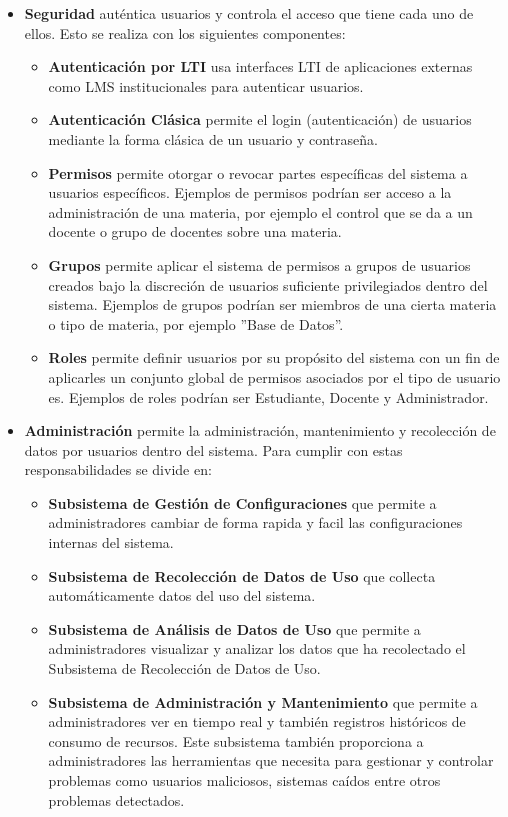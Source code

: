 \begin{itemize}
	\item \textbf{Seguridad} auténtica usuarios y controla el acceso que tiene cada uno de ellos. Esto se realiza con los siguientes componentes:
    \begin{itemize}
    	\item \textbf{Autenticación por LTI} usa interfaces LTI de aplicaciones externas como LMS institucionales para autenticar usuarios.
		\item \textbf{Autenticación Clásica} permite el login (autenticación) de usuarios mediante la forma clásica de un usuario y contraseña.
		\item \textbf{Permisos} permite otorgar o revocar partes específicas del sistema a usuarios específicos. Ejemplos de permisos podrían ser acceso a la administración de una materia, por ejemplo el control que se da a un docente o grupo de docentes sobre una materia.
		\item \textbf{Grupos} permite aplicar el sistema de permisos a grupos de usuarios creados bajo la discreción de usuarios suficiente privilegiados dentro del sistema. Ejemplos de grupos podrían ser miembros de una cierta materia o tipo de materia, por ejemplo ''Base de Datos''.
		\item \textbf{Roles} permite definir usuarios por su propósito del sistema con un fin de aplicarles un conjunto global de permisos asociados por el tipo de usuario es. Ejemplos de roles podrían ser Estudiante, Docente y Administrador.
    \end{itemize}
    \item \textbf{Administración} permite la administración, mantenimiento y recolección de datos por usuarios dentro del sistema. Para cumplir con estas responsabilidades se divide en:
    \begin{itemize}
    	\item \textbf{Subsistema de Gestión de Configuraciones} que permite a administradores cambiar de forma rapida y facil las configuraciones internas del sistema.
        \item \textbf{Subsistema de Recolección de Datos de Uso} que collecta automáticamente datos del uso del sistema.
        \item \textbf{Subsistema de Análisis de Datos de Uso} que permite a administradores visualizar y analizar los datos que ha recolectado el Subsistema de Recolección de Datos de Uso.
        \item \textbf{Subsistema de Administración y Mantenimiento} que permite a administradores ver en tiempo real y también registros históricos de consumo de recursos. Este subsistema también proporciona a administradores las herramientas que necesita para gestionar y controlar problemas como usuarios maliciosos, sistemas caídos entre otros problemas detectados.

\end{itemize}
\end{itemize}

